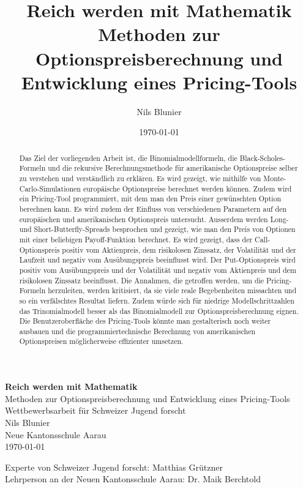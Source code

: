 \documentclass[11pt]{report} %
\title{\textbf{Reich werden mit Mathematik}\\Methoden zur Optionspreisberechnung und Entwicklung eines Pricing-Tools}
\author{Nils Blunier}
\date{\today}
\begin{document}
\begin{titlepage}
    \vspace*{\fill}
    \begin{center}
        \vspace{1cm}
        \Huge \textbf{Reich werden mit Mathematik}\\Methoden zur Optionspreisberechnung und Entwicklung eines Pricing-Tools \\
        \vspace{1cm}
        \Large Wettbewerbsarbeit für Schweizer Jugend forscht\\Nils Blunier\\Neue Kantonsschule Aarau\\ \today{}
    \end{center}
    \vspace*{\fill}
    \begin{flushright}
        \Large Experte von Schweizer Jugend forscht: Matthias Grützner\\Lehrperson an der Neuen Kantonsschule Aarau: Dr. Maik Berchtold
    \end{flushright}
\end{titlepage}

\begin{abstract}
Das Ziel der vorliegenden Arbeit ist, die Binomialmodellformeln, die Black-Scholes-Formeln und die rekursive Berechnungsmethode für amerikanische Optionspreise selber zu verstehen und verständlich zu erklären. Es wird gezeigt, wie mithilfe von Monte-Carlo-Simulationen europäische Optionspreise berechnet werden können. Zudem wird ein Pricing-Tool programmiert, mit dem man den Preis einer gewünschten Option berechnen kann. Es wird zudem der Einfluss von verschiedenen Parametern auf den europäischen und amerikanischen Optionspreis untersucht. Ausserdem werden Long- und Short-Butterfly-Spreads besprochen und gezeigt, wie man den Preis von Optionen mit einer beliebigen Payoff-Funktion berechnet. Es wird gezeigt, dass der Call-Optionspreis positiv vom Aktienpreis, dem risikolosen Zinssatz, der Volatilität und der Laufzeit und negativ vom Ausübungspreis beeinflusst wird. Der Put-Optionspreis wird positiv vom Ausübungspreis und der Volatilität und negativ vom Aktienpreis und dem risikolosen Zinssatz beeinflusst. Die Annahmen, die getroffen werden, um die Pricing-Formeln herzuleiten, werden kritisiert, da sie viele reale Begebenheiten missachten und so ein verfälschtes Resultat liefern. Zudem würde sich für niedrige Modellschrittzahlen das Trinomialmodell besser als das Binomialmodell zur Optionspreisberechnung eignen. Die Benutzeroberfläche des Pricing-Tools könnte man gestalterisch noch weiter ausbauen und die programmiertechnische Berechnung von amerikanischen Optionspreisen möglicherweise effizienter umsetzen.

\end{abstract}
\end{document}
